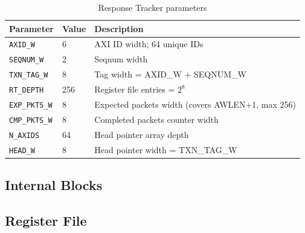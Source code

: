\begin{table}[h!]
\centering
\begin{tabular}{lll}
\toprule
\textbf{Parameter} & \textbf{Value} & \textbf{Description} \\
\midrule
\texttt{AXID\_W}          & 6   & AXI ID width; 64 unique IDs \\
\texttt{SEQNUM\_W}        & 2   & Seqnum width \\
\texttt{TXN\_TAG\_W}      & 8   & Tag width = AXID\_W + SEQNUM\_W \\
\texttt{RT\_DEPTH}        & 256 & Register file entries = $2^8$ \\
\texttt{EXP\_PKTS\_W}     & 8   & Expected packets width (covers AWLEN+1, max 256) \\
\texttt{CMP\_PKTS\_W}     & 8   & Completed packets counter width \\
\texttt{N\_AXIDS}         & 64  & Head pointer array depth \\
\texttt{HEAD\_W}          & 8   & Head pointer width = TXN\_TAG\_W \\
\bottomrule
\end{tabular}
\caption{Response Tracker parameters}
\end{table}

\subsection{Internal Blocks}

\subsection{Register File}

